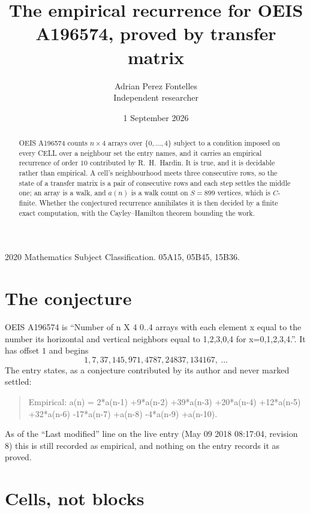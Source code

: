 \documentclass[11pt,a4paper]{article}
\title{The empirical recurrence for OEIS A196574, proved by transfer matrix}
\author{Adrian Perez Fontelles\\ \small Independent researcher}
\date{1 September 2026}
\theoremstyle{plain}
\theoremstyle{definition}
\begin{document}
\maketitle

\begin{abstract}
OEIS A196574 counts $n\times4$ arrays over $\{0,\dots,4\}$ subject to a condition imposed on
every CELL over a neighbour set the entry names, and it carries an empirical recurrence of
order $10$ contributed by R.~H.~Hardin. It is true, and it is decidable rather than
empirical. A cell's neighbourhood meets three consecutive rows, so the state of a transfer
matrix is a pair of consecutive rows and each step settles the middle one; an array is a
walk, and $a(n)$ is a walk count on $S=899$ vertices, which is $C$-finite. Whether the
conjectured recurrence annihilates it is then decided by a finite exact computation, with the
Cayley--Hamilton theorem bounding the work.
\end{abstract}

\noindent\small 2020 Mathematics Subject Classification. 05A15, 05B45, 15B36.\normalsize

\section{The conjecture}

OEIS A196574 is ``Number of n X 4 0..4 arrays with each element x equal to the number its horizontal and vertical neighbors equal to 1,2,3,0,4 for x=0,1,2,3,4.''. It has offset $1$ and begins
\[
1, 7, 37, 145, 971, 4787, 24837, 134167,\ \dots
\]
The entry states, as a conjecture contributed by its author and never marked settled:
\begin{quote}
Empirical: a(n) = 2*a(n-1) +9*a(n-2) +39*a(n-3) +20*a(n-4) +12*a(n-5) +32*a(n-6) -17*a(n-7) +a(n-8) -4*a(n-9) +a(n-10).
\end{quote}
As of the ``Last modified'' line on the live entry (May 09 2018 08:17:04, revision 8) this is still
recorded as empirical, and nothing on the entry records it as proved.

\section{Cells, not blocks}
\end{document}
